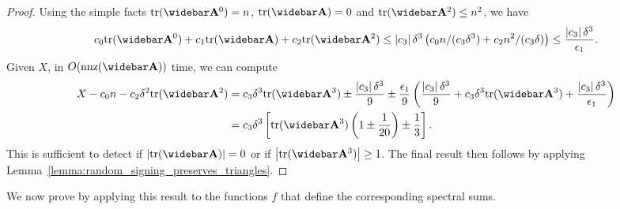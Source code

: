 \begin{proof}
Using the simple facts $\trace{\As^0} = n$, ${\trace{\As}} = 0$ and ${\trace{\As^2}} \leq n^2$, we have
\begin{align*}
    c_0\trace{\As^0} + c_1\trace{\As} + c_2 {\trace{\As^2}} \leq \abs{c_3}\delta^3 \pars{c_0 n/(c_3\delta^3) + c_2 n^2/(c_3 \delta)} \leq \frac{\abs{c_3} \delta^3}{\epsilon_1}.
\end{align*}
Given $X$, in $O(\nnz(\As))$ time, we can compute 
\begin{align*}
    X - c_0 n - c_2 \delta^2 {\trace{\As^2}} &= {c_3}\delta^3 \trace{\As^3} \pm \frac{\abs{c_3} \delta^3}{9} \pm \frac{\epsilon_1}{9}\pars{\frac{\abs{c_3}\delta^3}{9} + c_3 \delta^3 \trace{\As^3} +\frac{\abs{c_3}\delta^3}{\epsilon_1}}\\
    &= c_3 \delta^3 \sqrs{\trace{\As^3}\pars{1 \pm \frac{1}{20}} \pm \frac{1}{3}}.
\end{align*}
This is sufficient to detect if $\abs{\trace{\As}} = 0$ or if $\abs{\trace{\As^3}} \geq 1$. The final result then follows by applying Lemma~\ref{lemma:random_signing_preserves_triangles}.   
\end{proof}

We now prove  by applying this result to the functions $f$ that define the corresponding spectral sums.

